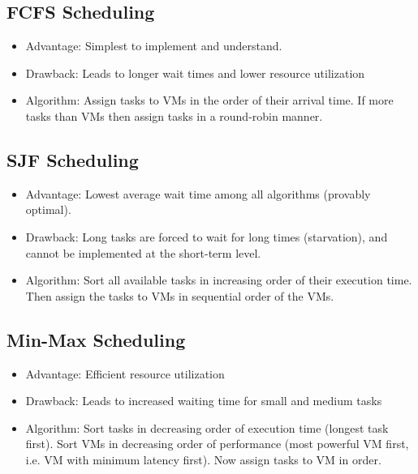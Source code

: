 \documentclass{article}
\begin{document}
\subsection{FCFS Scheduling}
\begin{itemize}
    \item Advantage: Simplest to implement and understand. 
    
    \item Drawback: Leads to longer wait times and lower resource utilization
    
    \item Algorithm: Assign tasks to VMs in the order of their arrival time. If more tasks than VMs then assign tasks in a round-robin manner.
\end{itemize}

\subsection{SJF Scheduling}
\begin{itemize}
    \item Advantage: Lowest average wait time among all algorithms (provably optimal). 
    
    \item Drawback: Long tasks are forced to wait for long times (starvation), and cannot be implemented at the short-term level. 
    
    \item Algorithm: Sort all available tasks in increasing order of their execution time. Then assign the tasks to VMs in sequential order of the VMs.
\end{itemize}

\subsection{Min-Max Scheduling}
\begin{itemize}
    \item Advantage: Efficient resource utilization
    
    \item Drawback: Leads to increased waiting time for small and medium tasks
    
    \item Algorithm: Sort tasks in decreasing order of execution time (longest task first). Sort VMs in decreasing order of performance (most powerful VM first, i.e. VM with minimum latency first). Now assign tasks to VM in order. 
\end{itemize}
\end{document}
